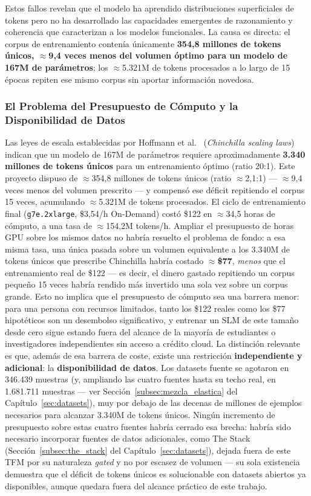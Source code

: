 Estos fallos revelan que el modelo ha aprendido distribuciones superficiales de tokens pero no ha desarrollado las capacidades emergentes de razonamiento y coherencia que caracterizan a los modelos funcionales. La causa es directa: el corpus de entrenamiento contenía únicamente \textbf{354,8 millones de tokens únicos, $\approx$9,4 veces menos del volumen óptimo para un modelo de 167M de parámetros}; los $\approx$5.321M de tokens procesados a lo largo de 15 épocas repiten ese mismo corpus sin aportar información novedosa.

\subsubsection{El Problema del Presupuesto de Cómputo y la Disponibilidad de Datos}

Las leyes de escala establecidas por Hoffmann et al.~\cite{hoffmann2022chinchilla} (\textit{Chinchilla scaling laws}) indican que un modelo de 167M de parámetros requiere aproximadamente \textbf{3.340 millones de tokens únicos} para un entrenamiento óptimo (ratio 20:1). Este proyecto dispuso de $\approx$354,8 millones de tokens únicos (ratio $\approx$2,1:1) --- $\approx$9,4 veces menos del volumen prescrito --- y compensó ese déficit repitiendo el corpus 15 veces, acumulando $\approx$5.321M de tokens procesados. El ciclo de entrenamiento final (\texttt{g7e.2xlarge}, \$3,54/h On-Demand) costó \$122 en $\approx$34,5 horas de cómputo, a una tasa de $\approx$154,2M tokens/h. Ampliar el presupuesto de horas GPU sobre los mismos datos no habría resuelto el problema de fondo: a esa misma tasa, una única pasada sobre un volumen equivalente a los 3.340M de tokens únicos que prescribe Chinchilla habría costado $\approx$\textbf{\$77}, \textit{menos} que el entrenamiento real de \$122 --- es decir, el dinero gastado repitiendo un corpus pequeño 15 veces habría rendido más invertido una sola vez sobre un corpus grande. Esto no implica que el presupuesto de cómputo sea una barrera menor: para una persona con recursos limitados, tanto los \$122 reales como los \$77 hipotéticos son un desembolso significativo, y entrenar un SLM de este tamaño desde cero sigue estando fuera del alcance de la mayoría de estudiantes o investigadores independientes sin acceso a crédito cloud. La distinción relevante es que, además de esa barrera de coste, existe una restricción \textbf{independiente y adicional}: la \textbf{disponibilidad de datos}. Los datasets fuente se agotaron en 346.439 muestras (y, ampliando las cuatro fuentes hasta su techo real, en 1.681.711 muestras --- ver Sección~\ref{subsec:mezcla_elastica} del Capítulo~\ref{sec:datasets}), muy por debajo de las decenas de millones de ejemplos necesarios para alcanzar 3.340M de tokens únicos. Ningún incremento de presupuesto sobre estas cuatro fuentes habría cerrado esa brecha: habría sido necesario incorporar fuentes de datos adicionales, como The Stack (Sección~\ref{subsec:the_stack} del Capítulo~\ref{sec:datasets}), dejada fuera de este TFM por su naturaleza \textit{gated} y no por escasez de volumen --- su sola existencia demuestra que el déficit de tokens únicos es solucionable con datasets abiertos ya disponibles, aunque quedara fuera del alcance práctico de este trabajo.

